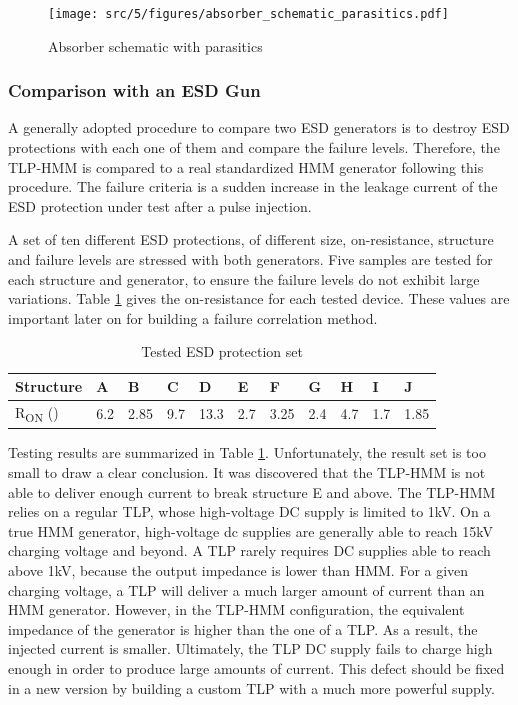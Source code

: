 \begin{figure}[!h]
  \centering
  \texttt{[image: src/5/figures/absorber\_schematic\_parasitics.pdf]}
  \caption{Absorber schematic with parasitics}
  \label{fig:absorber_schematic_parasitics}
\end{figure}

\subsubsection{Comparison with an ESD Gun}

A generally adopted procedure to compare two ESD generators is to destroy ESD protections with each one of them and compare the failure levels.
Therefore, the TLP-HMM is compared to a real standardized HMM generator following this procedure.
The failure criteria is a sudden increase in the leakage current of the ESD protection under test after a pulse injection.

A set of ten different ESD protections, of different size, on-resistance, structure and failure levels are stressed with both generators.
Five samples are tested for each structure and generator, to ensure the failure levels do not exhibit large variations.
Table \ref{tab:esd-protections} gives the on-resistance for each tested device.
These values are important later on for building a failure correlation method.

\begin{table}[!h]
\centering
\begin{tabular}{@{}lllllllllll@{}}
\toprule
Structure                          & A    & B    & C     & D    & E   & F   & G   & H   & I   & J   \\ \midrule
R\textsubscript{ON} (\textOmega{}) & 6.2  & 2.85 & 9.7  & 13.3 & 2.7 & 3.25& 2.4 & 4.7 & 1.7 & 1.85 \\
\end{tabular}
\caption{Tested ESD protection set}
\label{tab:esd-protections}
\end{table}

Testing results are summarized in Table \ref{tab:esd-protections}.
Unfortunately, the result set is too small to draw a clear conclusion.
It was discovered that the TLP-HMM is not able to deliver enough current to break structure E and above.
The TLP-HMM relies on a regular TLP, whose high-voltage DC supply is limited to 1kV.
On a true HMM generator, high-voltage \gls{dc} supplies are generally able to reach 15kV charging voltage and beyond.
A TLP rarely requires DC supplies able to reach above 1kV, because the output impedance is lower than HMM.
For a given charging voltage, a TLP will deliver a much larger amount of current than an HMM generator.
However, in the TLP-HMM configuration, the equivalent impedance of the generator is higher than the one of a TLP.
As a result, the injected current is smaller.
Ultimately, the TLP DC supply fails to charge high enough in order to produce large amounts of current.
This defect should be fixed in a new version by building a custom TLP with a much more powerful supply.

